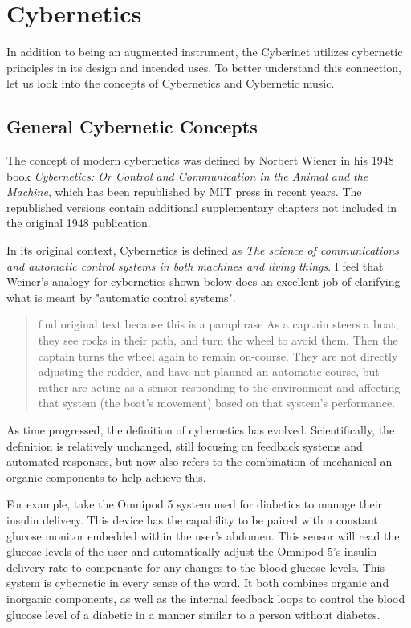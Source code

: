 \section{Cybernetics}
In addition to being an augmented instrument, the Cyberinet utilizes cybernetic principles in its design and intended uses. To better understand this connection, let us look into the concepts of Cybernetics and Cybernetic music.

\subsection{General Cybernetic Concepts}
The concept of modern cybernetics was defined by Norbert Wiener in his 1948 book \textit{Cybernetics: Or Control and Communication in the Animal and the Machine}, which has been republished by MIT press in recent years.\cite{WeinerCybernetics2019} The republished versions contain additional supplementary chapters not included in the original 1948 publication.

In its original context, Cybernetics is defined as \textit{The science of communications and automatic control systems in both machines and living things}. I feel that Weiner's analogy for cybernetics shown below does an excellent job of clarifying what is meant by "automatic control systems".

\begin{quote}
    find original text because this is a paraphrase
    As a captain steers a boat, they see rocks in their path, and turn the wheel to avoid them. Then the captain turns the wheel again to remain on-course. They are not directly adjusting the rudder, and have not planned an automatic course, but rather are acting as a sensor responding to the environment and affecting that system (the boat's movement) based on that system's performance.
\end{quote}

As time progressed, the definition of cybernetics has evolved. Scientifically, the definition is relatively unchanged, still focusing on feedback systems and automated responses, but now also refers to the combination of mechanical an organic components to help achieve this. %

For example, take the Omnipod 5 system used for diabetics to manage their insulin delivery. This device has the capability to be paired with a constant glucose monitor embedded within the user's abdomen. This sensor will read the glucose levels of the user and automatically adjust the Omnipod 5's insulin delivery rate to compensate for any changes to the blood glucose levels. This system is cybernetic in every sense of the word. It both combines organic and inorganic components, as well as the internal feedback loops to control the blood glucose level of a diabetic in a manner similar to a person without diabetes.

